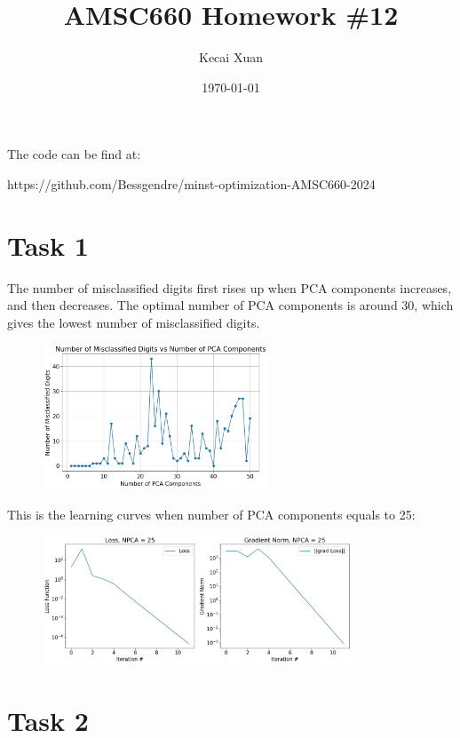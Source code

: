 \documentclass[12pt]{article}
\begin{document}
\setlength{\parindent}{0pt}

\title{AMSC660 Homework \#12}
\author{Kecai Xuan}
\date{\today}
\maketitle

The code can be find at:

https://github.com/Bessgendre/minst-optimization-AMSC660-2024

\section*{Task 1}

The number of misclassified digits first rises up when PCA components increases, and then decreases. The optimal number of PCA components is around 30, which gives the lowest number of misclassified digits.

\begin{figure}[ht]
    \centering
    \includegraphics[width=0.6\textwidth]{./imgs/component.png}
\end{figure}

This is the learning curves when number of PCA components equals to 25:
\begin{figure}[ht]
    \centering
    \includegraphics[width=0.82\textwidth]{./imgs/loss.png}
\end{figure}

\pagebreak

\section*{Task 2}
\end{document}
